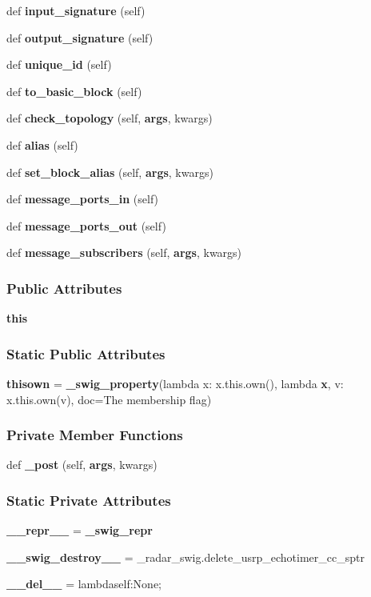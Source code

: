 \begin{DoxyCompactItemize}
\item 
def {\bf input\+\_\+signature} (self)
\item 
def {\bf output\+\_\+signature} (self)
\item 
def {\bf unique\+\_\+id} (self)
\item 
def {\bf to\+\_\+basic\+\_\+block} (self)
\item 
def {\bf check\+\_\+topology} (self, {\bf args}, kwargs)
\item 
def {\bf alias} (self)
\item 
def {\bf set\+\_\+block\+\_\+alias} (self, {\bf args}, kwargs)
\item 
def {\bf message\+\_\+ports\+\_\+in} (self)
\item 
def {\bf message\+\_\+ports\+\_\+out} (self)
\item 
def {\bf message\+\_\+subscribers} (self, {\bf args}, kwargs)
\end{DoxyCompactItemize}
\subsubsection*{Public Attributes}
\begin{DoxyCompactItemize}
\item 
{\bf this}
\end{DoxyCompactItemize}
\subsubsection*{Static Public Attributes}
\begin{DoxyCompactItemize}
\item 
{\bf thisown} = {\bf \+\_\+swig\+\_\+property}(lambda x\+: x.\+this.\+own(), lambda {\bf x}, v\+: x.\+this.\+own(v), doc=\textquotesingle{}The membership flag\textquotesingle{})
\end{DoxyCompactItemize}
\subsubsection*{Private Member Functions}
\begin{DoxyCompactItemize}
\item 
def {\bf \+\_\+post} (self, {\bf args}, kwargs)
\end{DoxyCompactItemize}
\subsubsection*{Static Private Attributes}
\begin{DoxyCompactItemize}
\item 
{\bf \+\_\+\+\_\+repr\+\_\+\+\_\+} = {\bf \+\_\+swig\+\_\+repr}
\item 
{\bf \+\_\+\+\_\+swig\+\_\+destroy\+\_\+\+\_\+} = \+\_\+radar\+\_\+swig.\+delete\+\_\+usrp\+\_\+echotimer\+\_\+cc\+\_\+sptr
\item 
{\bf \+\_\+\+\_\+del\+\_\+\+\_\+} = lambdaself\+:\+None;
\end{DoxyCompactItemize}


